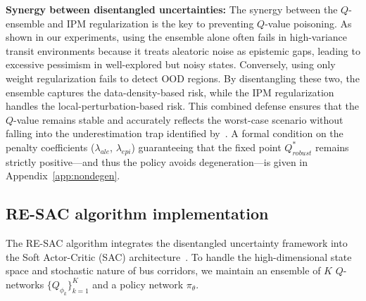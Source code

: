 \documentclass[10pt]{article}
\begin{document}
\textbf{Synergy between disentangled uncertainties:}
The synergy between the $Q$-ensemble and IPM regularization is the key to preventing $Q$-value poisoning. As shown in our experiments, using the ensemble alone often fails in high-variance transit environments because it treats aleatoric noise as epistemic gaps, leading to excessive pessimism in well-explored but noisy states. Conversely, using only weight regularization fails to detect OOD regions. By disentangling these two, the ensemble captures the data-density-based risk, while the IPM regularization handles the local-perturbation-based risk. This combined defense ensures that the $Q$-value remains stable and accurately reflects the worst-case scenario without falling into the underestimation trap identified by~\cite{Ji2024SeizingSerendipity}. A formal condition on the penalty coefficients ($\lambda_{ale}$, $\lambda_{epi}$) guaranteeing that the fixed point $Q^*_{robust}$ remains strictly positive---and thus the policy avoids degeneration---is given in Appendix~\ref{app:nondegen}.


\subsection{RE-SAC algorithm implementation}
The RE-SAC algorithm integrates the disentangled uncertainty framework into the Soft Actor-Critic (SAC) architecture~\cite{Haarnoja2018SAC}. To handle the high-dimensional state space and stochastic nature of bus corridors, we maintain an ensemble of $K$ $Q$-networks $\{Q_{\phi_k}\}_{k=1}^K$ and a policy network $\pi_\theta$.
\end{document}
